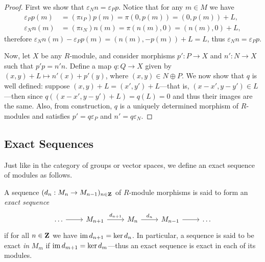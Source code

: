 \begin{proof}
First we show that \(\varepsilon_N n = \varepsilon_P p\). Notice that for any
\(m \in M\) we have
\begin{align*}
\varepsilon_P p(m) &= (\pi \iota_P) p(m) = \pi(0, p(m)) = (0, p(m)) + L, \\
\varepsilon_N n(m) &= (\pi \iota_N) n(m) = \pi(n(m), 0) = (n(m), 0) + L,
\end{align*}
therefore \(\varepsilon_N n(m) - \varepsilon_P p(m) = (n(m), -p(m)) + L = L\),
thus \(\varepsilon_N n = \varepsilon_P p\).

Now, let \(X\) be any \(R\)-module, and consider morphisms \(p': P \to X\) and
\(n': N \to X\) such that \(p' p = n' n\). Define a map \(q: Q \to X\) given by
\((x, y) + L \mapsto n'(x) + p'(y)\), where \((x, y) \in N \oplus P\). We now
show that \(q\) is well defined: suppose \((x, y) + L = (x', y') + L\)---that
is, \((x - x', y - y') \in L\)---then since
\(q((x - x', y - y') + L) = q(L) = 0\) and thus their images are the same. Also,
from construction, \(q\) is a uniquely determined morphism of \(R\)-modules and
satisfies \(p' = q \varepsilon_P\) and \(n' = q \varepsilon_N\).
\end{proof}

\subsection{Exact Sequences}

Just like in the category of groups or vector spaces, we define an exact
sequence of modules as follows.

\begin{definition}
\label{def:exact-sequence-modules}
A sequence \((d_n: M_n \to M_{n-1})_{n \in \mathbf{Z}}\) of \(R\)-module morphisms is
said to form an \emph{exact sequence}
\[
\begin{tikzcd}
\dots \ar[r] &M_{n+1} \ar[r, "d_{n+1}"]
&M_n \ar[r, "d_n"] &M_{n-1} \ar[r] &\dots
\end{tikzcd}
\]
if for all \(n \in \mathbf{Z}\) we have \(\operatorname{im} d_{n+1} = \ker d_n\). In particular, a
sequence is said to be exact \emph{in} \(M_m\) if
\(\operatorname{im} d_{m + 1} = \ker d_m\)---thus an exact sequence is exact in each of its
modules.
\end{definition}

